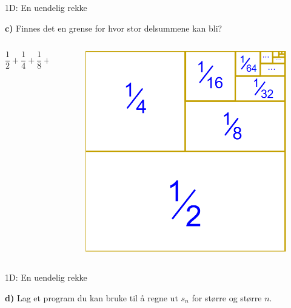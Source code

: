 \cyanheader
\begin{frame}[fragile]{1D: En uendelig rekke}

\textbf{c)} Finnes det en grense for hvor stor delsummene kan bli?

\begin{columns}
\begin{column}{0.5\textwidth}
   \[
\frac{1}{2}+\frac{1}{4}+\frac{1}{8}+\frac{1}{16}+\cdots
\]
\end{column}

\begin{column}{0.5\textwidth}
\begin{figure}
    \centering
    \includegraphics[width=0.8\linewidth]{R2K1D-3.png}
\end{figure}
\end{column}

\end{columns}

\end{frame}


\cyanheader
\begin{frame}[fragile]{1D: En uendelig rekke}

\textbf{d)} Lag et program du kan bruke til å regne ut $s_n$ for større og større $n$.\\

\end{frame}

